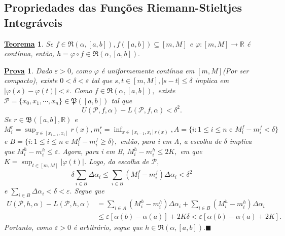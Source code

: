 \documentclass{article}
\newtheorem*{theorem*}{\underline{Teorema}}
\newtheorem*{proof*}{\underline{Prova}}
\renewcommand\qedsymbol{$\blacksquare$}
\begin{document}
\subsection{Propriedades das Fun\c cões Riemann-Stieltjes Integráveis}
 \begin{theorem*}
   Se \(f\in \mathfrak{R}(\alpha ,[a,b]), f([a, b])\subseteq{[m, M]}\) e \(\varphi :[m, M]\rightarrow \mathbb{R}\) é contínua,
   então, \(h=\varphi\circ{f}\in \mathfrak{R}(\alpha , [a,b]).\)
 \end{theorem*}
\begin{proof*}
  Dado \(\varepsilon >0\), como \(\varphi \) é uniformemente contínua em \([m, M]\)(Por ser compacto),
existe \(0 < \delta  < \varepsilon \) tal que \(s, t\in[m, M], |s-t|\leq \delta \) implica em \(|\varphi (s)-\varphi (t)| < \varepsilon .\)
Como \(f\in \mathfrak{R}(\alpha , [a, b]),\) existe \(\mathcal{P} = \{x_{0}, x_{1}, \cdots, x_{n}\}\in \mathfrak{P}([a, b])\) tal que
  \[
    U(\mathcal{P}, f, \alpha ) - L(\mathcal{P}, f, \alpha ) < \delta^{2}.
  \]
Se \(r\in \mathfrak{B}([a, b], \mathbb{R})\) e \(M_{i}^{r} = \sup_{x\in[x_{i-1}, x_{i}]}r(x), m_{i}^{r} = \inf_{x\in[x_{i-1}, x_{i}]r(x)}, 
A = \{i: 1\leq i\leq n\text{ e } M_{i}^{f}-m_{i}^{f} < \delta \}\) e \(B = \{i: 1\leq i\leq n\text{ e } M_{i}^{f}-m_{i}^{f}\geq \delta\},\) então,
para i em A, a escolha de \(\delta \) implica que \(M_{i}^{h} - m_{i}^{h}\leq \varepsilon .\) Agora, para i em B,
\(M_{i}^{h}-m_{i}^{h}\leq 2K,\) em que \(K=\sup_{t\in[m, M]}|\varphi (t)|\). Logo, da escolha de \(\mathcal{P},\) 
  \[
    \delta \sum\limits_{i\in B}^{}\Delta \alpha_{i}\leq \sum\limits_{i\in B}^{}(M_{i}^{f}-m_{i}^{f})\Delta \alpha_{i} < \delta^{2}
  \]
e \(\sum\limits_{i\in B}^{}\Delta\alpha_{i} < \delta <\varepsilon .\) Segue que 
\begin{align*}
  U(\mathcal{P}, h, \alpha ) - L(\mathcal{P}, h, \alpha ) &= \sum\limits_{i\in A}^{}(M_{i}^{h}-m_{i}^{h})\Delta \alpha_{i} + \sum\limits_{i\in B}^{}(M_{i}^{h}-m_{i}^{h})\Delta\alpha_{i} \\
                                                          &\leq \varepsilon [\alpha (b)-\alpha (a)]+2K\delta < \varepsilon [\alpha (b)-\alpha (a)+2K].
\end{align*}
  Portanto, como \(\varepsilon >0\) é arbitrário, segue que \(h\in \mathfrak{R}(\alpha , [a, b]).\)\qedsymbol
\end{proof*}
\end{document}
